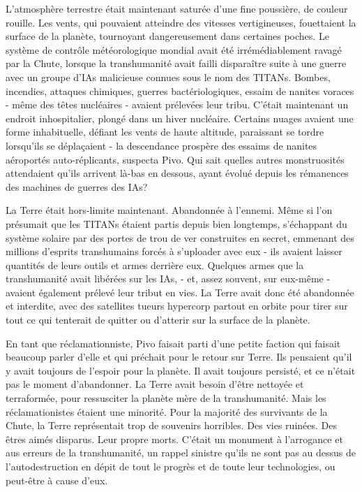 L'atmosphère terrestre était maintenant saturée d'une fine poussière, de couleur rouille. Les vents, qui pouvaient atteindre des vitesses vertigineuses, fouettaient la surface de la planète, tournoyant dangereusement dans certaines poches. Le système de contrôle météorologique mondial avait été irrémédiablement ravagé par la Chute, lorsque la transhumanité avait failli disparaître suite à une guerre avec un groupe d'IAs malicieuse connues sous le nom des TITANs. Bombes, incendies, attaques chimiques, guerres bactériologiques, essaim de nanites voraces - même des têtes nucléaires - avaient prélevées leur tribu. C'était maintenant un endroit inhospitalier, plongé dans un hiver nucléaire. Certains nuages avaient une forme inhabituelle, défiant les vents de haute altitude, paraissant se tordre lorsqu'ils se déplaçaient - la descendance prospère des essaims de nanites aéroportés auto-réplicants, suspecta Pivo. Qui sait quelles autres monstruosités attendaient qu'ils arrivent là-bas en dessous, ayant évolué depuis les rémanences des machines de guerres des IAs? 

La Terre était hors-limite maintenant. Abandonnée à l'ennemi. Même si l'on présumait que les TITANs étaient partis depuis bien longtemps, s'échappant du système solaire par des portes de trou de ver construites en secret, emmenant des millions d'esprits transhumains forcés à s'uploader avec eux - ils avaient laisser quantités de leurs outils et armes derrière eux. Quelques armes que la transhumanité avait libérées sur les IAs, - et, assez souvent, sur eux-même - avaient également prélevé leur tribut en vies. La Terre avait donc été abandonnée et interdite, avec des satellites tueurs hypercorp partout en orbite pour tirer sur tout ce qui tenterait de quitter ou d'atterir sur la surface de la planète. 

En tant que réclamationniste, Pivo faisait parti d'une petite faction qui faisait beaucoup parler d'elle et qui préchait pour le retour sur Terre. Ils pensaient qu'il y avait toujours de l'espoir pour la planète. Il avait toujours persisté, et ce n'était pas le moment d'abandonner. La Terre avait besoin d'être nettoyée et terraformée, pour ressusciter la planète mère de la transhumanité. Mais les réclamationistes étaient une minorité. Pour la majorité des survivants de la Chute, la Terre représentait trop de souvenirs horribles. Des vies ruinées. Des êtres aimés disparus. Leur propre morts. C'était un monument à l'arrogance et aus erreurs de la transhumanité, un rappel sinistre qu'ils ne sont pas au dessus de l'autodestruction en dépit de tout le progrès et de toute leur technologies, ou peut-être à cause d'eux. 


